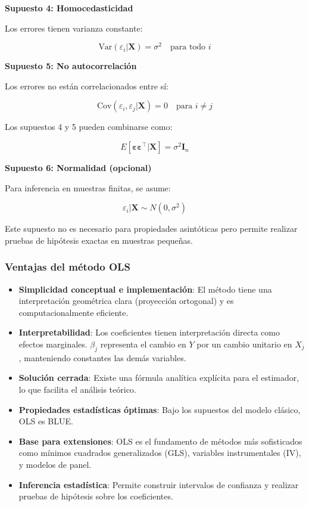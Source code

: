 \documentclass[
  doc,
  floatsintext,
  longtable,
  a4paper,
  nolmodern,
  notxfonts,
  notimes,
  12pt,
  colorlinks=true,linkcolor=blue,citecolor=blue,urlcolor=blue]{apa7}
\begin{document}
\textbf{Supuesto 4: Homocedasticidad}

Los errores tienen varianza constante:

\[
\text{Var}(\varepsilon_i | \mathbf{X}) = \sigma^2 \quad \text{para todo } i
\]

\textbf{Supuesto 5: No autocorrelación}

Los errores no están correlacionados entre sí:

\[
\text{Cov}(\varepsilon_i, \varepsilon_j | \mathbf{X}) = 0 \quad \text{para } i \neq j
\]

Los supuestos 4 y 5 pueden combinarse como:

\[
E[\boldsymbol{\varepsilon}\boldsymbol{\varepsilon}^\top | \mathbf{X}] = \sigma^2 \mathbf{I}_n
\]

\textbf{Supuesto 6: Normalidad (opcional)}

Para inferencia en muestras finitas, se asume:

\[
\varepsilon_i | \mathbf{X} \sim N(0, \sigma^2)
\]

Este supuesto no es necesario para propiedades asintóticas pero permite
realizar pruebas de hipótesis exactas en muestras pequeñas.

\subsubsection{Ventajas del método
OLS}\label{ventajas-del-muxe9todo-ols}

\begin{itemize}
\item
  \textbf{Simplicidad conceptual e implementación}: El método tiene una
  interpretación geométrica clara (proyección ortogonal) y es
  computacionalmente eficiente.
\item
  \textbf{Interpretabilidad}: Los coeficientes tienen interpretación
  directa como efectos marginales. \(\beta_j\) representa el cambio en
  \(Y\) por un cambio unitario en \(X_j\), manteniendo constantes las
  demás variables.
\item
  \textbf{Solución cerrada}: Existe una fórmula analítica explícita para
  el estimador, lo que facilita el análisis teórico.
\item
  \textbf{Propiedades estadísticas óptimas}: Bajo los supuestos del
  modelo clásico, OLS es BLUE.
\item
  \textbf{Base para extensiones}: OLS es el fundamento de métodos más
  sofisticados como mínimos cuadrados generalizados (GLS), variables
  instrumentales (IV), y modelos de panel.
\item
  \textbf{Inferencia estadística}: Permite construir intervalos de
  confianza y realizar pruebas de hipótesis sobre los coeficientes.
\end{itemize}
\end{document}
